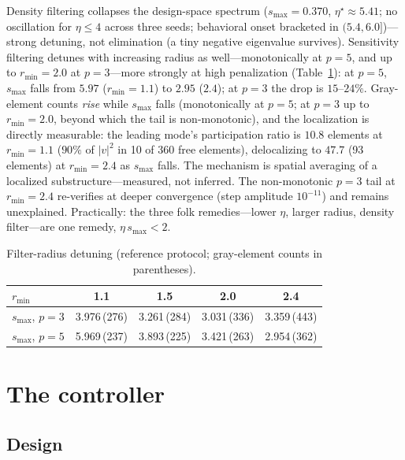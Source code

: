 \documentclass[11pt,a4paper]{article}
\newcommand{\smax}{s_{\max}}
\newcommand{\etastar}{\eta^{\star}}
\begin{document}
Density filtering collapses the design-space spectrum ($\smax=0.370$,
$\etastar\approx5.41$; no oscillation for $\eta\le4$ across three seeds;
behavioral onset bracketed in $(5.4,6.0]$)---strong detuning, not
elimination (a tiny negative eigenvalue survives). Sensitivity filtering
detunes with increasing radius as well---monotonically at $p=5$, and up
to $r_{\min}=2.0$ at $p=3$---more strongly at high penalization
(Table~\ref{tab:rmin}): at $p=5$, $\smax$ falls from $5.97$
($r_{\min}=1.1$) to $2.95$ ($2.4$); at $p=3$ the drop is
$15$--$24\%$. Gray-element counts \emph{rise} while $\smax$ falls (monotonically at
$p=5$; at $p=3$ up to $r_{\min}=2.0$, beyond which the tail is
non-monotonic), and the localization is directly measurable: the leading mode's participation
ratio is $10.8$ elements at $r_{\min}=1.1$ ($90\%$ of $|v|^2$ in 10 of
360 free elements), delocalizing to $47.7$ (93 elements) at
$r_{\min}=2.4$ as $\smax$ falls. The mechanism is spatial averaging of a
localized substructure---measured, not inferred. The non-monotonic
$p=3$ tail at $r_{\min}=2.4$ re-verifies at deeper convergence (step
amplitude $10^{-11}$) and remains unexplained. Practically: the three folk remedies---lower $\eta$, larger
radius, density filter---are one remedy, $\eta\,\smax<2$.

\begin{table}[t]
\centering\small
\caption{Filter-radius detuning (reference protocol; gray-element counts
in parentheses).}
\label{tab:rmin}
\begin{tabular}{lcccc}
\toprule
$r_{\min}$ & 1.1 & 1.5 & 2.0 & 2.4 \\
\midrule
$\smax$, $p=3$ & 3.976\,(276) & 3.261\,(284) & 3.031\,(336) & 3.359\,(443) \\
$\smax$, $p=5$ & 5.969\,(237) & 3.893\,(225) & 3.421\,(263) & 2.954\,(362) \\
\bottomrule
\end{tabular}
\end{table}

\section{The controller}\label{sec:controller}

\subsection{Design}\label{sec:design}
\end{document}
